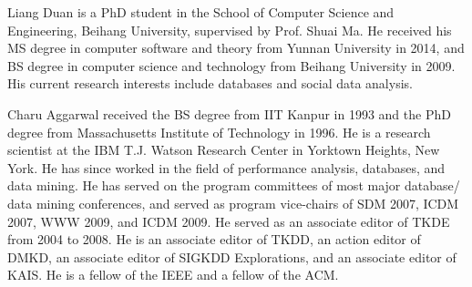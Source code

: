 \vspace{-8ex}
\begin{IEEEbiography}{Liang Duan} is a PhD student in the School of Computer Science and Engineering, Beihang University, supervised by Prof. Shuai Ma. He received his MS degree in computer software and theory from Yunnan University in 2014, and BS degree in computer science and technology from Beihang University in 2009. His current research interests include databases and social data analysis.
\end{IEEEbiography}
\vspace{-8ex}
\begin{IEEEbiography}{Charu Aggarwal} received the BS degree
from IIT Kanpur in 1993 and the PhD degree
from Massachusetts Institute of Technology in
1996. He is a research scientist at the IBM T.J.
Watson Research Center in Yorktown Heights,
New York. He has since worked in the field of
performance analysis, databases, and data mining.
He has served on the
program committees of most major database/
data mining conferences, and served as program vice-chairs of SDM 2007, ICDM 2007, WWW 2009, and ICDM
2009. He served as an associate editor of TKDE from 2004 to 2008. He is an
associate editor of TKDD, an action editor of DMKD, an associate editor of SIGKDD Explorations, and an associate editor of KAIS. He is a fellow of the IEEE and a fellow of the ACM.
\end{IEEEbiography}
\vspace{-8ex}
